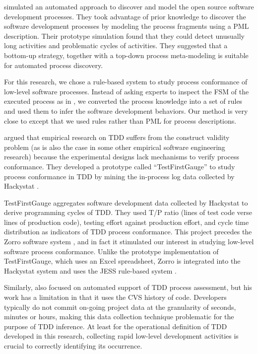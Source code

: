 \documentclass[smallextended]{svjour3}     %
\begin{document}
\cite{Jensen:04,Jensen:05} simulated an automated approach to discover and
model the open source software development processes. They took advantage
of prior knowledge to discover the software development processes by
modeling the process fragments using a PML description. Their prototype
simulation found that they could detect unusually long activities and
problematic cycles of activities. They suggested that a bottom-up strategy,
together with a top-down process meta-modeling is suitable for automated
process discovery. 

For this research, we chose a rule-based system to study process
conformance of low-level software processes. Instead of asking 
experts to inspect the FSM of the executed process as in 
\cite{Cook:95}, we converted the process knowledge into a set of rules and
used them to infer the software development behaviors. Our method is very
close to \cite{Jensen:04} except that we
used rules rather than PML for process descriptions.

\cite{Wang:04} argued that empirical research on TDD suffers from the construct validity problem (as is also the case in some other empirical software engineering research) because the experimental designs lack mechanisms to verify process conformance. They developed a prototype called ``TestFirstGauge'' to study process conformance in TDD by mining the in-process log data collected by Hackystat \citep{csdl2-04-11,csdl2-04-22,csdl2-03-12}.

TestFirstGauge aggregates software development data collected
by Hackystat to derive programming cycles of TDD. They used T/P ratio 
(lines of test code verse lines of production code), testing effort 
against production effort, and cycle time distribution as indicators 
of TDD process conformance. This project precedes the Zorro software 
system \citep{csdl2-06-02}, and in fact it stimulated our  interest 
in studying low-level software process conformance. Unlike the
prototype implementation of TestFirstGauge, which uses an Excel
spreadsheet, Zorro is integrated into the Hackystat system 
and uses the JESS rule-based system \citep{Friedman-Hill:03}.


Similarly, \cite{Wege:04} also focused on automated support of TDD process
assessment, but his work has a limitation in that it uses the CVS history
of code. Developers typically do not commit on-going project data at the
granularity of seconds, minutes or hours, making this data collection
technique problematic for the purpose of TDD inference. At least for the
operational definition of TDD developed in this research, collecting rapid
low-level development activities is crucial to correctly identifying its
occurrence.
\end{document}
